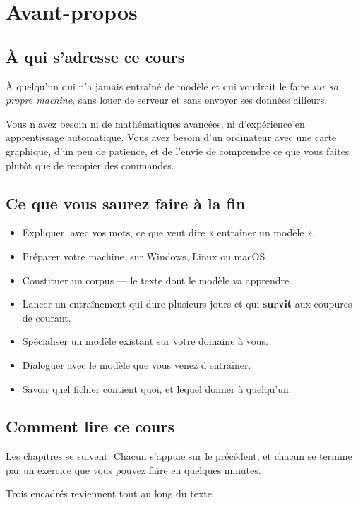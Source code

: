 \chapter{Avant-propos}

\section{À qui s'adresse ce cours}

À quelqu'un qui n'a jamais entraîné de modèle et qui voudrait le faire
\emph{sur sa propre machine}, sans louer de serveur et sans envoyer ses données
ailleurs.

Vous n'avez besoin ni de mathématiques avancées, ni d'expérience en
apprentissage automatique. Vous avez besoin d'un ordinateur avec une carte
graphique, d'un peu de patience, et de l'envie de comprendre ce que vous faites
plutôt que de recopier des commandes.

\section{Ce que vous saurez faire à la fin}

\begin{itemize}
  \item Expliquer, avec vos mots, ce que veut dire « entraîner un modèle ».
  \item Préparer votre machine, sur Windows, Linux ou macOS.
  \item Constituer un corpus — le texte dont le modèle va apprendre.
  \item Lancer un entraînement qui dure plusieurs jours et qui \textbf{survit}
        aux coupures de courant.
  \item Spécialiser un modèle existant sur votre domaine à vous.
  \item Dialoguer avec le modèle que vous venez d'entraîner.
  \item Savoir quel fichier contient quoi, et lequel donner à quelqu'un.
\end{itemize}

\section{Comment lire ce cours}

Les chapitres se suivent. Chacun s'appuie sur le précédent, et chacun se termine
par un exercice que vous pouvez faire en quelques minutes.

Trois encadrés reviennent tout au long du texte.

